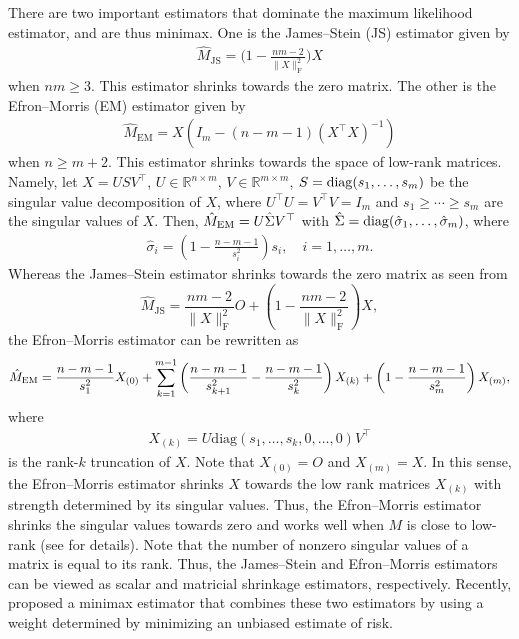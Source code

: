 \documentclass[11pt, a4paper]{article}
\theoremstyle{remark}
\begin{document}
There are two important estimators that dominate the maximum likelihood estimator, and are thus minimax. 
One is the James--Stein (JS) estimator \citep{james1961estimation} given by
\begin{align}
\hat M_{\mathrm{JS}}=\Big(1-\frac{nm-2}{\| X \|_{\mathrm{F}}^2}\Big)X \label{JS}
\end{align}
when $nm \geq 3$.
This estimator shrinks towards the zero matrix.
The other is the Efron--Morris (EM) estimator \citep{efron1972empirical} given by
\begin{align}
\hat M_{\mathrm{EM}}=X \left( I_m-(n-m-1)(X^\top X)^{-1} \right) \label{EM}
\end{align}
when $n \geq m+2$.
This estimator shrinks towards the space of low-rank matrices.
Namely, let $X = U S V^{\top}$, $U \in \mathbb{R}^{n \times m}$, $V \in \mathbb{R}^{m \times m}$, $S = {\rm diag} (s_1, \dots, s_m)$ be the singular value decomposition of $X$, where $U^{\top} U = V^{\top} V = I_m$ and
$ s_1 \geq \cdots \geq  s_m
$ are the singular values of $X$.
Then, $\hat{M}_{{\rm EM}} = U \hat{\Sigma} V^{\top}$ with $\hat{\Sigma} = {\rm diag} (\hat{\sigma}_1, \dots, \hat{\sigma}_m)$, where
\begin{align*}
	\hat{\sigma}_i = \left( 1 - \frac{n-m-1}{s_i^2} \right) s_i, \quad i=1, \ldots, m.
\end{align*}
Whereas the James--Stein estimator shrinks towards the zero matrix as seen from
\[
\hat{M}_{\mathrm{JS}} = \frac{nm-2}{\| X \|_{\mathrm{F}}^2} O + \left(1-\frac{nm-2}{\| X \|_{\mathrm{F}}^2} \right) X,
\]
the Efron--Morris estimator can be rewritten as
\begin{align*}
    \hat{M}_{{\rm EM}} = \frac{n-m-1}{s_1^2} X_{(0)} + \sum_{k=1}^{m-1} \left( \frac{n-m-1}{s_{k+1}^2} - \frac{n-m-1}{s_k^2} \right) X_{(k)} + \left( 1 - \frac{n-m-1}{s_m^2} \right) X_{(m)},
\end{align*}
where
\begin{align*}
    X_{(k)} = U \mathrm{diag} (s_1,\dots,s_k,0,\dots,0) V^{\top}
\end{align*}
is the rank-$k$ truncation of $X$.
Note that $X_{(0)}=O$ and $X_{(m)}=X$.
In this sense, the Efron--Morris estimator shrinks $X$ towards the low rank matrices $X_{(k)}$ with strength determined by its singular values.
Thus, the Efron--Morris estimator shrinks the singular values towards zero and works well when $M$ is close to low-rank (see \cite{matsuda2022estimation} for details).
Note that the number of nonzero singular values of a matrix is equal to its rank.
Thus, the James--Stein and Efron--Morris estimators can be viewed as scalar and matricial shrinkage estimators, respectively.
Recently, \cite{yuasa2023weighted} proposed a minimax estimator that combines these two estimators by using a weight determined by minimizing an unbiased estimate of risk. 
\end{document}
